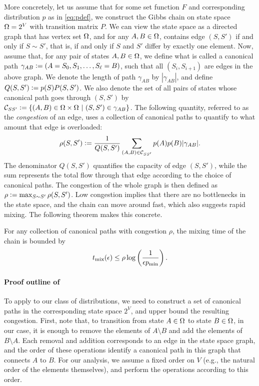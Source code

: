 More concretely, let us assume that for some set function $F$ and corresponding distribution $p$ as in \eqref{eq:pdef}, we construct the Gibbs chain on state space $\ss = 2^V$ with transition matrix $P$.
We can view the state space as a directed graph that has vertex set $\ss$, and for any $A, B \in \ss$, contains edge $(S, S')$ if and only if $S \sim S'$, that is, if and only if $S$ and $S'$ differ by exactly one element.
Now, assume that, for any pair of states $A, B \in \ss$, we define what is called a canonical path $\gamma_{AB} \defeq (A = S_0, S_1, \ldots, S_{\ell} = B)$, such that all $(S_i, S_{i+1})$ are edges in the above graph.
We denote the length of path $\gamma_{AB}$ by $|\gamma_{AB}|$, and define $Q(S, S') \defeq p(S) P(S, S')$.
We also denote the set of all pairs of states whose canonical path goes through $(S, S')$ by $\mathcal{C}_{SS'} \defeq \sdef{(A, B) \in \ss \times \ss}{(S, S') \in \gamma_{AB}}$.
The following quantity, referred to as the \emph{congestion} of an edge, uses a collection of canonical paths to quantify to what amount that edge is overloaded:
\begin{align} \label{eq:cong}
  \rho(S, S') \defeq \frac{1}{Q(S, S')} \sum_{(A, B) \in \mathcal{C}_{SS'}} p(A) p(B) |\gamma_{AB}|.
\end{align}
The denominator $Q(S, S')$ quantifies the capacity of edge $(S, S')$, while the sum represents the total flow through that edge according to the choice of canonical paths.
The congestion of the whole graph is then defined as $\rho \defeq \max_{S \sim S'}\rho(S, S')$.
Low congestion implies that there are no bottlenecks in the state space, and the chain can move around fast, which also suggests rapid mixing.
The following theorem makes this concrete.

\begin{theorem} \label{thm:cpath}
  For any collection of canonical paths with congestion $\rho$, the mixing time of the chain is bounded by
  \begin{align*}
  	\tme \leq \rho \log\left(\frac{1}{\epsilon p_{\mathrm{min}}}\right).
  \end{align*}
\end{theorem}

\paragraph{Proof outline of }
To apply  to our class of distributions, we need to construct a set of canonical paths in the corresponding state space $2^V$, and upper bound the resulting congestion.
First, note that, to transition from state $A \in \ss$ to state $B \in \ss$, in our case, it is enough to remove the elements of $A \setminus B$ and add the elements of $B \setminus A$.
Each removal and addition corresponds to an edge in the state space graph, and the order of these operations identify a canonical path in this graph that connects $A$ to $B$.
For our analysis, we assume a fixed order on $V$ (e.g., the natural order of the elements themselves), and perform the operations according to this order.

